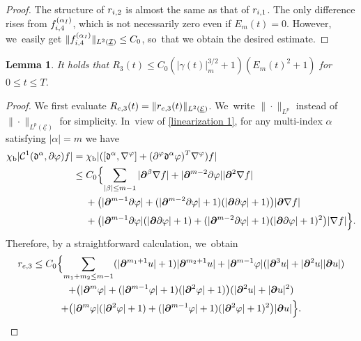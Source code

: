 \documentclass[11pt]{article}
\newcommand{\cI}{{\mathcal I}}
\newcommand{\cE}{{\mathcal E}}
\newcommand{\ul}[1]{\underline{#1}}
\newtheorem{lemma}[theorem]{Lemma}
\theoremstyle{definition}
\begin{document}
\begin{proof}
The structure of $r_{{\rm i},2}$ is almost the same as that of $r_{{\rm i},1}$.
The only difference rises from $f_{{\rm i},4}^{(\alpha_I)}$, which is not necessarily zero even if $E_m(t)=0$.
However, we~easily get $\|f_{{\rm i},4}^{(\alpha_I)}\|_{L^2(\ul{\cI})} \leq C_0$, so~that we obtain the desired estimate.
\end{proof}

\begin{lemma}\label{lem:EstR3}
It holds that $R_3(t) \leq C_0(|\gamma(t)|_m^{3/2}+1)(E_m(t)^2+1)$ for $0\leq t\leq T$.
\end{lemma}

\begin{proof}
We first evaluate $R_{{\rm e},3}(t)=\|r_{{\rm e},3}(t)\|_{L^2(\ul{\cE})}$. We~write $\|\cdot\|_{L^p}$ instead of $\|\cdot\|_{L^p(\ul{\cE})}$ for simplicity. In~view of \eqref{linearization 1}, for any multi-index $\alpha$ satisfying $|\alpha|=m$ we have
\begin{align*}
\chi_\mathrm{b}|{\mathcal C}^1(\mathfrak{d}^\alpha,\partial \varphi)f|
&= \chi_\mathrm{b}|([\mathfrak{d}^\alpha,\nabla^\varphi]+(\partial^\varphi\mathfrak{d}^\alpha\varphi)^{\rm T}\nabla^\varphi)f| \\
&\leq C_0 \Bigl\{ \sum_{|\beta|\leq m-1}|\bm{\partial}^\beta\nabla f| + |\bm{\partial}^{m-2}\partial\varphi||\bm{\partial}^2\nabla f| \\
&\quad\;
+ \bigl(|\bm{\partial}^{m-1}\partial\varphi| + (|\bm{\partial}^{m-2}\partial\varphi|+1)(|\bm{\partial}\partial\varphi|+1) \bigr)|\bm{\partial}\nabla f| \\
&\quad\;
+ \bigl(|\bm{\partial}^{m-1}\partial\varphi|(|\bm{\partial}\partial\varphi|+1)
+ (|\bm{\partial}^{m-2}\partial\varphi|+1)(|\bm{\partial}\partial\varphi|+1)^2 \bigr) |\nabla f| \Bigr\}.
\end{align*}
Therefore, by a straightforward calculation, we~obtain
\begin{multline*}
r_{{\rm e},3}
\leq C_0 \Bigl\{ \sum_{m_1+m_2\leq m-1}(|\bm{\partial}^{m_1+1}u|+1)|\bm{\partial}^{m_2+1}u|
+ |\bm{\partial}^{m-1}\varphi|(|\bm{\partial}^3u| + |\bm{\partial}^2u||\bm{\partial}u|) \\
+ \bigl(|\bm{\partial}^m\varphi| + (|\bm{\partial}^{m-1}\varphi|+1)(|\bm{\partial}^2\varphi|+1) \bigr)(|\bm{\partial}^2u|+|\bm{\partial}u|^2) \\
+ \bigl(|\bm{\partial}^m\varphi|(|\bm{\partial}^2\varphi|+1) + (|\bm{\partial}^{m-1}\varphi|+1)(|\bm{\partial}^2\varphi|+1)^2 \bigr) |\bm{\partial}u| \Bigr\}.
\end{multline*}


\end{proof}
\end{document}
